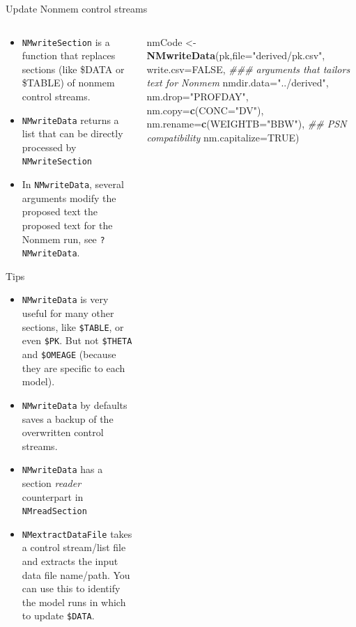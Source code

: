 \documentclass[
  8pt,
  ignorenonframetext,
  aspectratio=169]{beamer}
\newenvironment{Shaded}{\begin{snugshade}}{\end{snugshade}}
\newcommand{\CommentTok}[1]{\textcolor[rgb]{0.56,0.35,0.01}{\textit{#1}}}
\newcommand{\DataTypeTok}[1]{\textcolor[rgb]{0.13,0.29,0.53}{#1}}
\newcommand{\KeywordTok}[1]{\textcolor[rgb]{0.13,0.29,0.53}{\textbf{#1}}}
\newcommand{\NormalTok}[1]{#1}
\newcommand{\OtherTok}[1]{\textcolor[rgb]{0.56,0.35,0.01}{#1}}
\newcommand{\StringTok}[1]{\textcolor[rgb]{0.31,0.60,0.02}{#1}}
\begin{document}
\begin{frame}[fragile]{Update Nonmem control streams}
\protect\hypertarget{update-nonmem-control-streams}{}
\begin{columns}[T]
\begin{column}{0.48\textwidth}
\begin{itemize}
\item
  \texttt{NMwriteSection} is a function that replaces sections (like
  \$DATA or \$TABLE) of nonmem control streams.
\item
  \texttt{NMwriteData} returns a list that can be directly processed by
  \texttt{NMwriteSection}
\item
  In \texttt{NMwriteData}, several arguments modify the proposed text
  the proposed text for the Nonmem run, see \texttt{?NMwriteData}.
\end{itemize}

\begin{block}{Tips}
\protect\hypertarget{tips}{}
\begin{itemize}
\item
  \texttt{NMwriteData} is very useful for many other sections, like
  \texttt{\$TABLE}, or even \texttt{\$PK}. But not \texttt{\$THETA} and
  \texttt{\$OMEAGE} (because they are specific to each model).
\item
  \texttt{NMwriteData} by defaults saves a backup of the overwritten
  control streams.
\item
  \texttt{NMwriteData} has a section \emph{reader} counterpart in
  \texttt{NMreadSection}
\item
  \texttt{NMextractDataFile} takes a control stream/list file and
  extracts the input data file name/path. You can use this to identify
  the model runs in which to update \texttt{\$DATA}.
\end{itemize}
\end{block}
\end{column}

\begin{column}{0.48\textwidth}
\footnotesize

\begin{Shaded}
\begin{Highlighting}[]
\NormalTok{nmCode \textless{}{-}}\StringTok{ }\KeywordTok{NMwriteData}\NormalTok{(pk,}\DataTypeTok{file=}\StringTok{"derived/pk.csv"}\NormalTok{,}
                      \DataTypeTok{write.csv=}\OtherTok{FALSE}\NormalTok{,}
\CommentTok{\#\#\# arguments that tailors text for Nonmem}
                      \DataTypeTok{nmdir.data=}\StringTok{"../derived"}\NormalTok{,}
                      \DataTypeTok{nm.drop=}\StringTok{"PROFDAY"}\NormalTok{,}
                      \DataTypeTok{nm.copy=}\KeywordTok{c}\NormalTok{(}\DataTypeTok{CONC=}\StringTok{"DV"}\NormalTok{),}
                      \DataTypeTok{nm.rename=}\KeywordTok{c}\NormalTok{(}\DataTypeTok{WEIGHTB=}\StringTok{"BBW"}\NormalTok{),}
                      \CommentTok{\#\# PSN compatibility}
                      \DataTypeTok{nm.capitalize=}\OtherTok{TRUE}\NormalTok{)}
\end{Highlighting}
\end{Shaded}


\end{column}
\end{columns}
\end{frame}
\end{document}
